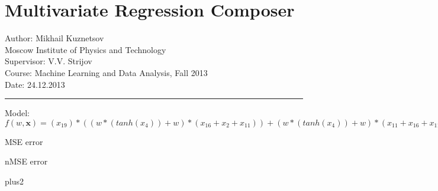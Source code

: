 \documentclass[12pt]{article}
\begin{document}
\section*{Multivariate Regression Composer}
Author: Mikhail Kuznetsov\\
Moscow Institute of Physics and Technology\\
Supervisor: V.V. Strijov\\
Course: Machine Learning and Data Analysis, Fall 2013\\
Date: 24.12.2013\\
\hrule
\vspace{1cm}
Model: $f(w,\mathbf{x})=(x_19)*((w*(tanh(x_4))+w)*(x_16+x_2+x_11))+(w*(tanh(x_4))+w)*(x_11+x_16+x_11+x_20)$

MSE error

nMSE error


\begin{bundle}{plus2}\end{bundle}
\end{document}
